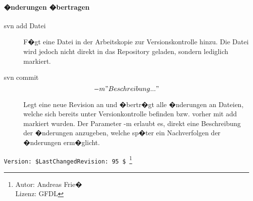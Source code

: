 \paragraph[�nderungen �bertragen]{�nderungen �bertragen}
\begin{description}
	\item[svn add Datei] F�gt eine Datei in der Arbeitskopie zur Versionskontrolle hinzu. Die Datei wird jedoch nicht direkt in das Repository geladen, sondern lediglich markiert.
\end{description}
\begin{description}
	\item[svn commit \[-m"Beschreibung..."\]] Legt eine neue Revision an und �bertr�gt alle �nderungen an Dateien, welche sich bereits unter Versionkontrolle befinden bzw. vorher mit add markiert wurden. Der Parameter -m erlaubt es, direkt eine Beschreibung der �nderungen anzugeben, welche sp�ter ein Nachverfolgen der �nderungen erm�glicht.
\end{description}

\verb|Version: $LastChangedRevision: 95 $ |\footnote{ Autor: Andreas Frie�\\Lizenz: GFDL}